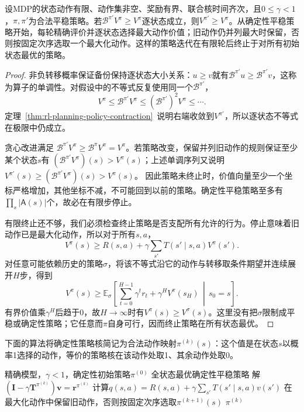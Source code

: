 \begin{theorem}[策略改进及策略迭代的有限终止]
 \label{thm:rl-planning-policy-improvement}
 设MDP的状态动作有限、动作集非空、奖励有界、联合核时间齐次，且$0\leq\gamma<1$，$\pi,\pi'$为合法平稳策略。若$\mathcal B^{\pi'}V^\pi\geq V^\pi$逐状态成立，则$V^{\pi'}\geq V^\pi$。从确定性平稳策略开始，每轮精确评价并逐状态选择最大动作价值；旧动作仍并列最大时保留，否则按固定次序选取一个最大化动作。这样的策略迭代在有限轮后终止于对所有初始状态最优的策略。
\end{theorem}
\begin{proof}
 非负转移概率保证备份保持逐状态大小关系：$u\geq v$就有$\mathcal B^{\pi'}u\geq \mathcal B^{\pi'}v$，这称为算子的单调性。对假设中的不等式反复使用同一个$\mathcal B^{\pi'}$，
 \[
 V^\pi\leq \mathcal B^{\pi'}V^\pi
 \leq (\mathcal B^{\pi'})^2V^\pi\leq\cdots.
 \]
 定理~\ref{thm:rl-planning-policy-contraction}~说明右端收敛到$V^{\pi'}$，所以逐状态不等式在极限中仍成立。

 贪心改进满足
 $\mathcal B^{\pi'}V^\pi\geq \mathcal B^\pi V^\pi=V^\pi$。若策略改变，保留并列旧动作的规则保证至少某个状态$s$有
 $(\mathcal B^{\pi'}V^\pi)(s)>V^\pi(s)$；上述单调序列又说明
 $V^{\pi'}(s)\geq(\mathcal B^{\pi'}V^\pi)(s)>V^\pi(s)$。
 因此策略未终止时，价值向量至少一个坐标严格增加，其他坐标不减，不可能回到以前的策略。确定性平稳策略至多有$\prod_s|\mathsf A(s)|$个，故必在有限步停止。

 有限终止还不够，我们必须检查终止策略是否支配所有允许的行为。停止意味着旧动作已是最大化动作，所以对于所有$s,a$，
 \[
 V^\pi(s)\geq R(s,a)+\gamma\sum_{s'}T(s'\mid s,a)V^\pi(s').
 \]
 对任意可能依赖历史的策略$\sigma$，将该不等式沿它的动作与转移取条件期望并连续展开$H$步，得到
 \[
 V^\pi(s)\geq
 \mathbb E_\sigma\!\left[
 \sum_{t=0}^{H-1}\gamma^t r_t+\gamma^H V^\pi(s_H)
 \,\middle|\,s_0=s\right].
 \]
 有界价值乘$\gamma^H$后趋于0，故$H\to\infty$时有$V^\pi(s)\geq V^\sigma(s)$。这里没有把$\sigma$限制成平稳或确定性策略；它任意而$\pi$自身可行，因而终止策略在所有状态最优。
\end{proof}

下面的算法将确定性策略核简记为合法动作映射$\pi^{(k)}(s)$：这个值是在状态$s$以概率1选择的动作，等价的策略核在该动作处取1、其余动作处取0。

\begin{algorithm}[精确策略迭代]
 \label{alg:rl-planning-policy-iteration}
 \begin{algorithmic}[1]
  \Require 精确模型，$\gamma<1$，确定性初始策略$\pi^{(0)}$
  \Ensure 全状态最优确定性平稳策略
   \State 解$(\bm I-\gamma\bm T^{\pi^{(k)}})\bm v=\bm r^{\pi^{(k)}}$
    \State 计算$q(s,a)=R(s,a)+\gamma\sum_{s'}T(s'\mid s,a)v(s')$
    \State 在最大化动作中保留旧动作，否则按固定次序选取$\pi^{(k+1)}(s)$
   \EndFor
    \State \Return $\pi^{(k)}$
   \EndIf
  \EndFor
 \end{algorithmic}
\end{algorithm}

